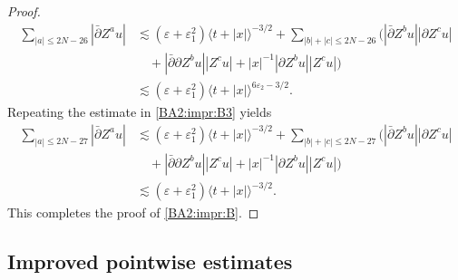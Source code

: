 \documentclass[11pt,twoside]{article}
\def\p{\partial}
\def\ve{\varepsilon}
\def\ls{\lesssim}
\newcommand{\w}[1]{\langle {#1} \rangle}
\theoremstyle{plain}
\theoremstyle{definition}
\numberwithin{equation}{section}
\begin{document}
\begin{proof}
\begin{equation}
\begin{split}
\sum_{|a|\le2N-26}|\bar\p Z^au|
&\ls(\ve+\ve_1^2)\w{t+|x|}^{-3/2}+\sum_{|b|+|c|\le2N-26}(|\bar\p Z^bu||\p Z^cu|\\
&\quad+|\bar\p\p Z^bu||Z^cu|+|x|^{-1}|\p Z^bu||Z^cu|)\\
&\ls(\ve+\ve_1^2)\w{t+|x|}^{6\ve_2-3/2}.
\end{split}
\end{equation}
Repeating the estimate in \eqref{BA2:impr:B3} yields
\begin{equation*}
\begin{split}
\sum_{|a|\le2N-27}|\bar\p Z^au|
&\ls(\ve+\ve_1^2)\w{t+|x|}^{-3/2}+\sum_{|b|+|c|\le2N-27}(|\bar\p Z^bu||\p Z^cu|\\
&\quad+|\bar\p\p Z^bu||Z^cu|+|x|^{-1}|\p Z^bu||Z^cu|)\\
&\ls(\ve+\ve_1^2)\w{t+|x|}^{-3/2}.
\end{split}
\end{equation*}
This completes the proof of \eqref{BA2:impr:B}.
\end{proof}


\subsection{Improved pointwise estimates}
\end{document}
